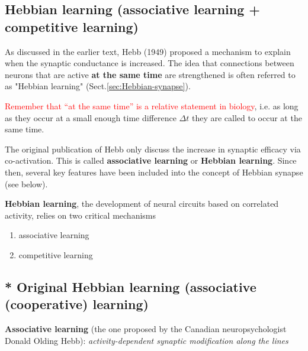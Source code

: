 \subsection{Hebbian learning (associative learning + competitive learning)}
\label{sec:Hebbian_learning}

As discussed in the earlier text, Hebb (1949) proposed a mechanism to explain
when the synaptic conductance is increased. The idea that connections between
neurons that are active {\bf at the same time} are strengthened is often
referred to as "Hebbian learning" (Sect.\ref{sec:Hebbian-synapse}).

\textcolor{red}{Remember that ``at the same time'' is a relative statement in
biology}, i.e. as long as they occur at a small enough time difference $\Delta
t$ they are called to occur at the same time.

The original publication of Hebb only discuss the increase in synaptic efficacy
via co-activation. This is called {\bf associative learning} or {\bf
Hebbian learning}. Since then, several key features have been included into the
concept of Hebbian synapse (see below).

{\bf Hebbian learning}, the development of neural circuits based on
correlated activity, relies on two critical mechanisms
\begin{enumerate}
  \item associative learning
  
  \item competitive learning
\end{enumerate}

\subsection{* Original Hebbian learning (associative (cooperative) learning)}
\label{sec:associative_learning}
{\bf Associative learning} (the one proposed by the Canadian neuropsychologist
Donald Olding Hebb): {\it activity-dependent synaptic modification along the
lines}


